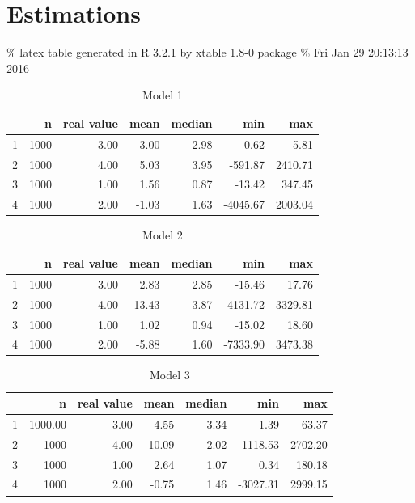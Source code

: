 \documentclass[]{article}
\begin{document}
\section{Estimations}

\% latex table generated in R 3.2.1 by xtable 1.8-0 package \% Fri Jan
29 20:13:13 2016

\begin{table}[ht]
\centering
\begin{tabular}{rrrrrrr}
  \hline
 & n & real value & mean & median & min & max \\ 
  \hline
1 & 1000 & 3.00 & 3.00 & 2.98 & 0.62 & 5.81 \\ 
  2 & 1000 & 4.00 & 5.03 & 3.95 & -591.87 & 2410.71 \\ 
  3 & 1000 & 1.00 & 1.56 & 0.87 & -13.42 & 347.45 \\ 
  4 & 1000 & 2.00 & -1.03 & 1.63 & -4045.67 & 2003.04 \\ 
   \hline
\end{tabular}
\caption{Model 1}
\end{table}

\begin{table}[ht]
\centering
\begin{tabular}{rrrrrrr}
  \hline
 & n & real value & mean & median & min & max \\ 
  \hline
1 & 1000 & 3.00 & 2.83 & 2.85 & -15.46 & 17.76 \\ 
  2 & 1000 & 4.00 & 13.43 & 3.87 & -4131.72 & 3329.81 \\ 
  3 & 1000 & 1.00 & 1.02 & 0.94 & -15.02 & 18.60 \\ 
  4 & 1000 & 2.00 & -5.88 & 1.60 & -7333.90 & 3473.38 \\ 
   \hline
\end{tabular}
\caption{Model 2}
\end{table}

\begin{table}[ht]
\centering
\begin{tabular}{rrrrrrr}
  \hline
 & n & real value & mean & median & min & max \\ 
  \hline
1 & 1000.00 & 3.00 & 4.55 & 3.34 & 1.39 & 63.37 \\ 
  2 & 1000 & 4.00 & 10.09 & 2.02 & -1118.53 & 2702.20 \\ 
  3 & 1000 & 1.00 & 2.64 & 1.07 & 0.34 & 180.18 \\ 
  4 & 1000 & 2.00 & -0.75 & 1.46 & -3027.31 & 2999.15 \\ 
   \hline
\end{tabular}
\caption{Model 3}
\end{table}
\end{document}

